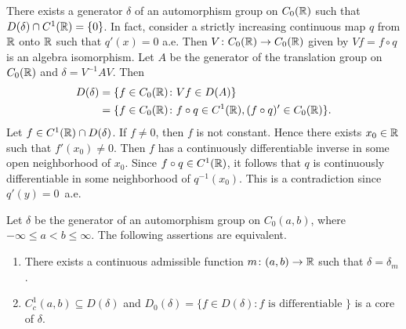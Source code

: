 \begin{example}\label{ex:b2-3.22}
%
There exists a generator $\delta$ of an automorphism group on $C_{0}(\mathbb{R})$ such that $D(\delta) \cap C^{1}(\mathbb{R}) = \{0\}$.
In fact, consider a strictly increasing continuous map $q$ from $\mathbb{R}$ onto $\mathbb{R}$ such that
$q'(x) = 0$ a.e.
Then $V \colon C_{0}(\mathbb{R}) \to C_{0}(\mathbb{R})$ given by $Vf = f \circ q$ is an algebra isomorphism.
Let $A$ be the generator of the translation group on $C_{0}(\mathbb{R})$ and $\delta = V^{-1}AV$.
Then 
\begin{align*}
D(\delta) &= \{ f \in C_{0}(\mathbb{R}) \colon Vf \in D(A)\} \\
&= \{f \in C_{0}(\mathbb{R}) \colon f \circ q \in C^{1}(\mathbb{R}), (f \circ q)' \in C_{0}(\mathbb{R}) \}.
\end{align*}
Let $f \in C^{1}(\mathbb{R}) \cap D(\delta)$.
If\/ $f \neq 0$, then $f$ is not constant.
Hence there exists $x_{0} \in \mathbb{R}$ such that $f'(x_{0}) \neq 0$.
Then $f$ has a continuously differentiable inverse in some open neighborhood of\/ $x_{0}$.
Since $f \circ q \in C^{1}(\mathbb{R})$, it follows that $q$ is continuously differentiable in some neighborhood of\/ $q^{-1}(x_{0})$.
This is a contradiction since $q'(y) = 0$~a.e.
\end{example}
\begin{theorem}\label{thm:b2-3.23}
%
Let $\delta$ be the generator of an automorphism group on $C_{0}(a,b)$, where $-\infty \leq a < b \leq \infty$.
The following assertions are equivalent.
\begin{enumerate}[\upshape (a)]
\item \label{thm:b2-3.23-1} 
There exists a continuous admissible function $m \colon (a,b) \to \mathbb{R}$ such that $\delta = \delta_{m}$.
\item \label{thm:b2-3.23-2}
$C_{c}^{1}(a,b) \subseteq D(\delta)$ and $D_{0}(\delta) = \{ f \in D(\delta) \colon f \text{ is differentiable } \}$ is a core of\/ $\delta$.
\end{enumerate}
\end{theorem}
